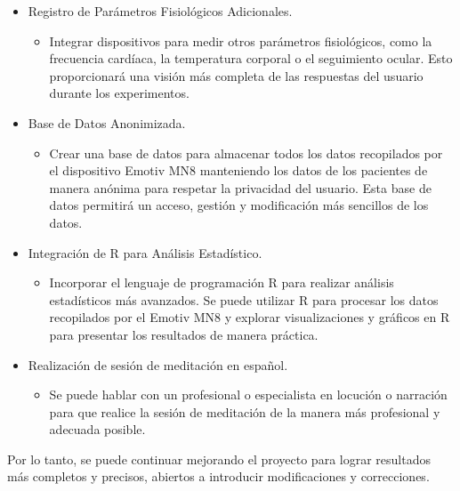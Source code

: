 \begin{itemize}
    \item Registro de Parámetros Fisiológicos Adicionales.
    \begin{itemize}
        \item Integrar dispositivos para medir otros parámetros fisiológicos, como la frecuencia cardíaca, la temperatura corporal o el seguimiento ocular. Esto proporcionará una visión más completa de las respuestas del usuario durante los experimentos.
    \end{itemize}
    \item Base de Datos Anonimizada.
    \begin{itemize}
        \item Crear una base de datos para almacenar todos los datos recopilados por el dispositivo Emotiv MN8 manteniendo los datos de los pacientes de manera anónima para respetar la privacidad del usuario. Esta base de datos permitirá un acceso, gestión y modificación más sencillos de los datos.
    \end{itemize}
    \item Integración de R para Análisis Estadístico.
    \begin{itemize}
        \item Incorporar el lenguaje de programación R para realizar análisis estadísticos más avanzados. Se puede utilizar R para procesar los datos recopilados por el Emotiv MN8 y explorar visualizaciones y gráficos en R para presentar los resultados de manera práctica.
    \end{itemize}
    \item Realización de sesión de meditación en español.
    \begin{itemize}
        \item Se puede hablar con un profesional o especialista en locución o narración para que realice la sesión de meditación de la manera más profesional y adecuada posible.
    \end{itemize}
\end{itemize}

Por lo tanto, se puede continuar mejorando el proyecto para lograr resultados más completos y precisos, abiertos a introducir modificaciones y correcciones.
